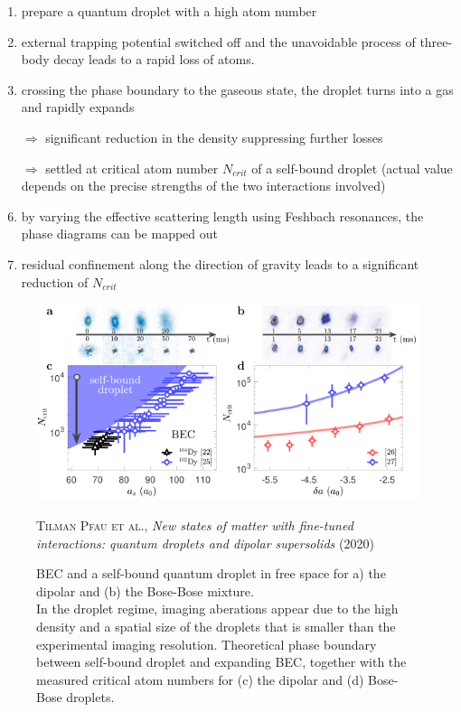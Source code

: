 \begin{itemize}
\begin{enumerate}
            \item prepare a quantum droplet with a high atom number
            \item external trapping potential switched off and the unavoidable process of three-body decay leads to a rapid loss of atoms.
            \item crossing the phase boundary to the gaseous state, the droplet turns into a gas and
                rapidly expands
            \item[$\Rightarrow$] significant reduction in the density suppressing further losses
            \item[$\Rightarrow$] settled at critical atom number $N_{crit}$ of a self-bound droplet (actual value  depends on the precise strengths of the two interactions involved)
            \item by varying the effective scattering length using Feshbach resonances, the phase diagrams can
                be mapped out
            \item residual confinement along the direction of gravity leads to a significant reduction of $N_{crit}$
        \end{enumerate}
\end{itemize}

\begin{figure}[H]
    \centering
    \includegraphics[width=1.0\textwidth]{IMAGE/self_bound.png}\\
    \caption{
            BEC and a self-bound quantum droplet in free space for a) the dipolar and (b) the Bose-Bose mixture. \\
            In the droplet regime, imaging aberations appear due to the high density and a spatial size of the droplets that is smaller than the experimental imaging resolution. Theoretical phase boundary between self-bound droplet and expanding BEC, together with the measured critical atom numbers for (c) the dipolar and (d) Bose-Bose droplets.
      }
    \textsc{Tilman Pfau et al.}, \emph{New states of matter with fine-tuned interactions: quantum droplets and dipolar supersolids} (2020)
    \label{fig:self_bound}
\end{figure}


